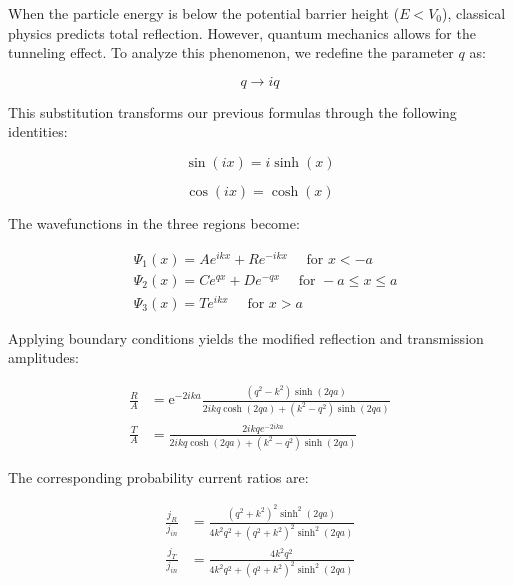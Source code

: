\documentclass[10pt]{article}
\begin{document}
When the particle energy is below the potential barrier height ($E < V_0$), classical physics predicts total reflection. However, quantum mechanics allows for the tunneling effect. To analyze this phenomenon, we redefine the parameter $q$ as:

\begin{equation*}
q \rightarrow i q \tag{6.73}
\end{equation*}

This substitution transforms our previous formulas through the following identities:

\begin{equation*}
\sin (i x)=i \sinh (x) \tag{6.75}
\end{equation*}

\begin{equation*}
\cos (i x)=\cosh (x) \tag{6.76}
\end{equation*}

The wavefunctions in the three regions become:

\begin{align*}
& \Psi_{1}(x)=A e^{i k x}+R e^{-i k x} \quad \text { for } x<-a \\
& \Psi_{2}(x)=C e^{q x}+D e^{-q x} \quad \text { for }-a \leq x \leq a  \tag{6.77}\\
& \Psi_{3}(x)=T e^{i k x} \quad \text { for } x>a
\end{align*}

Applying boundary conditions yields the modified reflection and transmission amplitudes:

\begin{align*}
\frac{R}{A} & =\mathrm{e}^{-2 i k a} \frac{\left(q^{2}-k^{2}\right) \sinh (2 q a)}{2 i k q \cosh (2 q a)+\left(k^{2}-q^{2}\right) \sinh (2 q a)} \\
\frac{T}{A} & =\frac{2 i k q e^{-2 i k a}}{2 i k q \cosh (2 q a)+\left(k^{2}-q^{2}\right) \sinh (2 q a)} \tag{6.78}
\end{align*}

The corresponding probability current ratios are:

\begin{align*}
\frac{j_{R}}{j_{i n}} & =\frac{\left(q^{2}+k^{2}\right)^{2} \sinh ^{2}(2 q a)}{4 k^{2} q^{2}+\left(q^{2}+k^{2}\right)^{2} \sinh ^{2}(2 q a)}  \tag{6.79}\\
\frac{j_{T}}{j_{i n}} & =\frac{4 k^{2} q^{2}}{4 k^{2} q^{2}+\left(q^{2}+k^{2}\right)^{2} \sinh ^{2}(2 q a)}
\end{align*}
\end{document}
